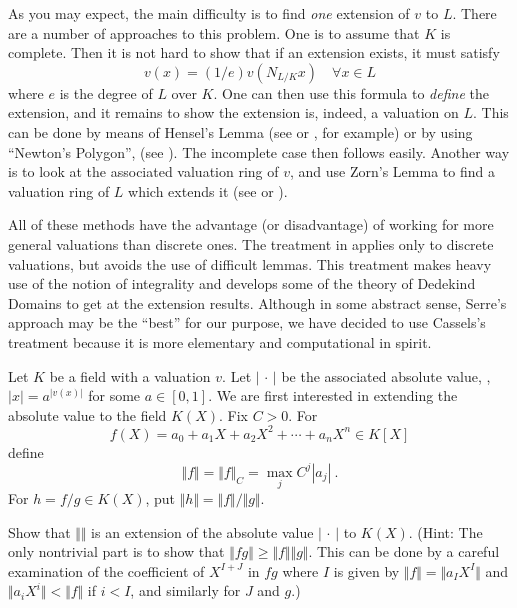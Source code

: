 As you may expect, the main difficulty is to find {\it one} extension of $v$ to $L$. There are a number of approaches to this problem. One is to assume that $K$ is complete. Then it is not hard to show that if an extension exists, it must satisfy
\begin{equation}
\label{eq3.31}
v(x)=(1/e)v(N_{L/K}x)\quad \forall x\in L
\end{equation}
where $e$ is the degree of $L$ over $K$. One can then use this formula to {\it define} the extension, and it remains to show the extension is, indeed, a valuation on $L$. This can be done by means of Hensel's Lemma (see \cite{r2.2} or \cite{r2.16}, for example) or by using ``Newton's Polygon'', (see \cite{r2.4}). The incomplete case then follows easily. Another way is to look at the associated valuation ring of $v$, and use Zorn's Lemma to find a valuation ring of $L$ which extends it (see \cite{r2.3} or \cite{r2.11}).

All of these methods have the advantage (or disadvantage) of working for more general valuations than discrete ones. The treatment in \cite{r2.14} applies only to discrete valuations, but avoids the use of difficult lemmas. This treatment makes heavy use of the notion of integrality and develops some of the theory of Dedekind Domains to get at the extension results. Although in some abstract sense, Serre's approach may be the ``best'' for our purpose, we have decided to use Cassels's treatment because it is more elementary and computational in spirit.

Let $K$ be a field with a valuation $v$. Let $|\, \cdot\, |$ be the associated absolute value, \ie, $|x|=a^{|v(x)|}$ for some $a\in[0,1]$. We are first interested in extending the absolute value to the field $K(X)$. Fix $C>0$. For
$$
f(X)=a_{0}+a_{1}X+a_{2}X^{2}+\cdots+a_{n}X^{n}\in K[X]
$$
define
$$
\Vert f\Vert=\Vert f\Vert_{C}=\max_j C^{j}|a_{j}|\ .
$$
For $h=f/g\in K(X)$, put $\Vert h\Vert=\Vert f\Vert/\Vert g\Vert$.

\begin{exo}
\label{e3.2.1}
Show that $\Vert\Vert$ is an extension of the absolute value $|\, \cdot\, |$ to $K(X)$. (Hint: The only nontrivial part is to show that $\Vert fg\Vert\geq\Vert f\Vert\Vert g\Vert$. This can be done by a careful examination of the coefficient of $X^{I+J}$ in $fg$ where $I$ is given by $\Vert f\Vert=\Vert a_{I}X^{I}\Vert$ and $\Vert a_{i}X^{i}\Vert<\Vert f\Vert$ if $i<I$, and similarly for $J$ and $g.$)
\end{exo}

